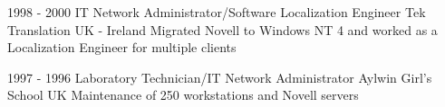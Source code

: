 \begin{twenty}
\twentyitem
  {1998 - 2000}
  {IT Network Administrator/Software Localization Engineer}
  {Tek Translation}
  {}
  {UK - Ireland}
  {Migrated Novell to Windows NT 4 and worked as a Localization Engineer for multiple clients}
  {}
  {}
\end{twenty}
\begin{twenty}
\twentyitem
  {1997 - 1996}
  {Laboratory Technician/IT Network Administrator}
  {Aylwin Girl's School}
  {}
  {UK}
  {Maintenance of 250 workstations and Novell servers}
  {}
  {}
\end{twenty}
